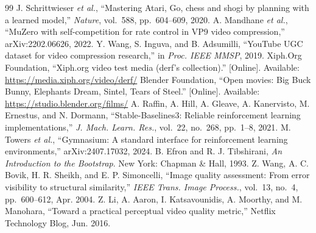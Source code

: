 \documentclass[conference]{IEEEtran}
\begin{document}
\begin{thebibliography}{99}
 J. Schrittwieser \emph{et al.}, ``Mastering Atari, Go, chess and shogi by planning with a learned model,'' \emph{Nature}, vol.~588, pp.~604--609, 2020.
 A. Mandhane \emph{et al.}, ``MuZero with self-competition for rate control in VP9 video compression,'' arXiv:2202.06626, 2022.
 Y. Wang, S. Inguva, and B. Adsumilli, ``YouTube UGC dataset for video compression research,'' in \emph{Proc. IEEE MMSP}, 2019.
 Xiph.Org Foundation, ``Xiph.org video test media (derf's collection).'' [Online]. Available: \url{https://media.xiph.org/video/derf/}
 Blender Foundation, ``Open movies: Big Buck Bunny, Elephants Dream, Sintel, Tears of Steel.'' [Online]. Available: \url{https://studio.blender.org/films/}
 A. Raffin, A. Hill, A. Gleave, A. Kanervisto, M. Ernestus, and N. Dormann, ``Stable-Baselines3: Reliable reinforcement learning implementations,'' \emph{J. Mach. Learn. Res.}, vol.~22, no.~268, pp.~1--8, 2021.
 M. Towers \emph{et al.}, ``Gymnasium: A standard interface for reinforcement learning environments,'' arXiv:2407.17032, 2024.
 B. Efron and R. J. Tibshirani, \emph{An Introduction to the Bootstrap}. New York: Chapman \& Hall, 1993.
 Z. Wang, A. C. Bovik, H. R. Sheikh, and E. P. Simoncelli, ``Image quality assessment: From error visibility to structural similarity,'' \emph{IEEE Trans. Image Process.}, vol.~13, no.~4, pp.~600--612, Apr. 2004.
 Z. Li, A. Aaron, I. Katsavounidis, A. Moorthy, and M. Manohara, ``Toward a practical perceptual video quality metric,'' Netflix Technology Blog, Jun. 2016.
\end{thebibliography}
\end{document}
